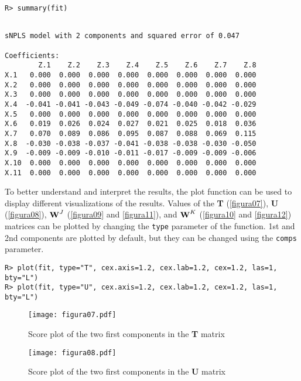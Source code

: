 \begin{verbatim}
R> summary(fit)
\end{verbatim}


\begin{verbatim}

sNPLS model with 2 components and squared error of 0.047 
 
Coefficients: 
        Z.1    Z.2    Z.3    Z.4    Z.5    Z.6    Z.7    Z.8
X.1   0.000  0.000  0.000  0.000  0.000  0.000  0.000  0.000
X.2   0.000  0.000  0.000  0.000  0.000  0.000  0.000  0.000
X.3   0.000  0.000  0.000  0.000  0.000  0.000  0.000  0.000
X.4  -0.041 -0.041 -0.043 -0.049 -0.074 -0.040 -0.042 -0.029
X.5   0.000  0.000  0.000  0.000  0.000  0.000  0.000  0.000
X.6   0.019  0.026  0.024  0.027  0.021  0.025  0.018  0.036
X.7   0.070  0.089  0.086  0.095  0.087  0.088  0.069  0.115
X.8  -0.030 -0.038 -0.037 -0.041 -0.038 -0.038 -0.030 -0.050
X.9  -0.009 -0.009 -0.010 -0.011 -0.017 -0.009 -0.009 -0.006
X.10  0.000  0.000  0.000  0.000  0.000  0.000  0.000  0.000
X.11  0.000  0.000  0.000  0.000  0.000  0.000  0.000  0.000
\end{verbatim}

To better understand and interpret the results, the plot function can be used to display different visualizations of the results. Values of the \textbf{T} (\autoref{figura07}), \textbf{U} (\autoref{figura08}), $\textbf{\text{W}}^{J}$ (\autoref{figura09} and \autoref{figura11}), and $\textbf{\text{W}}^{K}$ (\autoref{figura10} and \autoref{figura12}) matrices can be plotted by changing the \texttt{type} parameter of the function. 1st and 2nd components are plotted by default, but they can be changed using the \texttt{comps} parameter.

\begin{verbatim}
R> plot(fit, type="T", cex.axis=1.2, cex.lab=1.2, cex=1.2, las=1, bty="L")
R> plot(fit, type="U", cex.axis=1.2, cex.lab=1.2, cex=1.2, las=1, bty="L")
\end{verbatim}


\begin{figure}[!ht]
\centering
\texttt{[image: figura07.pdf]}
\caption{Score plot of the two first components in the \textbf{T} matrix}
\label{figura07}
\end{figure}

\begin{figure}[!ht]
\centering
\texttt{[image: figura08.pdf]}
\caption{Score plot of the two first components in the \textbf{U} matrix}
\label{figura08}
\end{figure}

